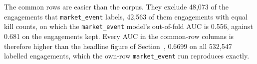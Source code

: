 The common rows are easier than the corpus. They exclude 48,073 of the engagements that
\texttt{market\_event} labels, 42,563 of them engagements with equal kill counts, on which the
\texttt{market\_event} model's out-of-fold AUC is 0.556, against 0.681 on the engagements kept. Every
AUC in the common-row columns is therefore higher than the headline figure of
Section~, 0.6699 on all 532,547 labelled engagements, which the own-row
\texttt{market\_event} run reproduces exactly.

